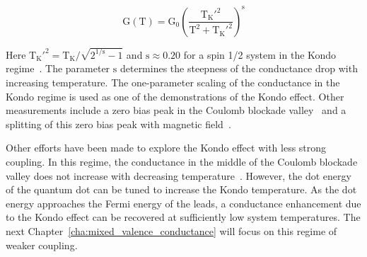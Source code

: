 \begin{equation}\label{eq:kondo_conductance}
 \mathrm{G(T)} =
 \mathrm{G_0}
 \left(
 \frac{\mathrm{T_K'^{2}}}{\mathrm{T^2} + \mathrm{T_K'^{2}}}
 \right)^\mathrm{s}
\end{equation}

\noindent Here $\mathrm{T_K'^{2}} = \mathrm{T_K}/\sqrt{2^{\mathrm{1/s}}-1}$ and $\mathrm{s} \approx 0.20$ for a spin 1/2 system in the Kondo regime~\cite{goldhaber_mv}. The parameter $\mathrm{s}$ determines the steepness of the conductance drop with increasing temperature. The one-parameter scaling of the conductance in the Kondo regime is used as one of the demonstrations of the Kondo effect. Other measurements include a zero bias peak in the Coulomb blockade valley~\cite{kondo_unitary} and a splitting of this zero bias peak with magnetic field~\cite{cronenwett_tunable_kondo}. 

Other efforts have been made to explore the Kondo effect with less strong coupling. In this regime, the conductance in the middle of the Coulomb blockade valley does not increase with decreasing temperature~\cite{goldhaber_mv}. However, the dot energy of the quantum dot can be tuned to increase the Kondo temperature. As the dot energy approaches the Fermi energy of the leads, a conductance enhancement due to the Kondo effect can be recovered at sufficiently low system temperatures. The next Chapter~\ref{cha:mixed_valence_conductance} will focus on this regime of weaker coupling.


